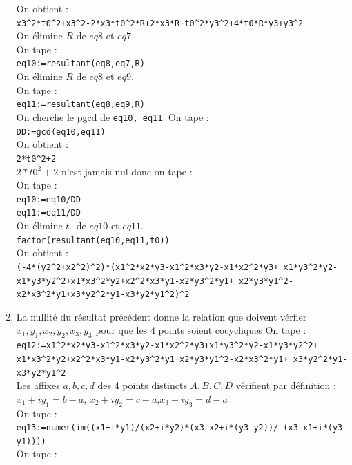 \documentclass[a4paper,11pt]{book}
\begin{document}
\begin{enumerate}
On obtient :\\
{\tt x3\verb|^|2*t0\verb|^|2+x3\verb|^|2-2*x3*t0\verb|^|2*R+2*x3*R+t0\verb|^|2*y3\verb|^|2+4*t0*R*y3+y3\verb|^|2}\\
On \'elimine $R$ de $eq8$ et $eq7$.\\
On tape :\\
{\tt eq10:=resultant(eq8,eq7,R)}\\
On \'elimine $R$ de $eq8$ et $eq9$.\\
On tape :\\
{\tt eq11:=resultant(eq8,eq9,R)}\\
On cherche le pgcd de {\tt eq10, eq11}. On tape :\\
{\tt DD:=gcd(eq10,eq11)}\\
On obtient :\\
{\tt 2*t0\verb|^|2+2}\\
$2*t0^2+2$ n'est jamais nul donc on tape :\\
On tape :\\
{\tt eq10:=eq10/DD}\\
{\tt eq11:=eq11/DD}\\
On \'elimine $t_0$ de $eq10$ et $eq11$.\\
{\tt factor(resultant(eq10,eq11,t0))}\\
On obtient :\\
{\tt (-4*(y2\verb|^|2+x2\verb|^|2)\verb|^|2)*(x1\verb|^|2*x2*y3-x1\verb|^|2*x3*y2-x1*x2\verb|^|2*y3+ x1*y3\verb|^|2*y2-x1*y3*y2\verb|^|2+x1*x3\verb|^|2*y2+x2\verb|^|2*x3*y1-x2*y3\verb|^|2*y1+ x2*y3*y1\verb|^|2-x2*x3\verb|^|2*y1+x3*y2\verb|^|2*y1-x3*y2*y1\verb|^|2)\verb|^|2}
\item 
La nullit\'e du r\'esultat pr\'ec\'edent donne la relation que doivent v\'erfier 
$x_1,y_1,x_2,y_2,x_3,y_3$ pour que les 4 points soient cocycliques 
On tape :\\
{\tt eq12:=x1\verb|^|2*x2*y3-x1\verb|^|2*x3*y2-x1*x2\verb|^|2*y3+x1*y3\verb|^|2*y2-x1*y3*y2\verb|^|2+ x1*x3\verb|^|2*y2+x2\verb|^|2*x3*y1-x2*y3\verb|^|2*y1+x2*y3*y1\verb|^|2-x2*x3\verb|^|2*y1+ x3*y2\verb|^|2*y1-x3*y2*y1\verb|^|2}\\
Les affixes $a,b,c,d$ des 4 points distincts $A,B,C,D$ v\'erifient par 
d\'efinition :\\
$x_1+iy_1=b-a$, $x_2+iy_2=c-a$,$x_3+iy_3=d-a$\\
On tape :\\
{\tt eq13:=numer(im((x1+i*y1)/(x2+i*y2)*(x3-x2+i*(y3-y2))/ (x3-x1+i*(y3-y1))))}\\
On tape :\\

\end{enumerate}
\end{document}
